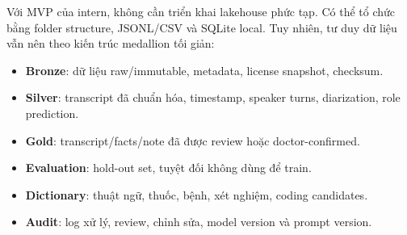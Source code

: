 \documentclass[12pt,a4paper]{article}
\begin{document}
Với MVP của intern, không cần triển khai lakehouse phức tạp. Có thể tổ chức bằng folder structure, JSONL/CSV và SQLite local. Tuy nhiên, tư duy dữ liệu vẫn nên theo kiến trúc medallion tối giản:

\begin{itemize}
    \item \textbf{Bronze}: dữ liệu raw/immutable, metadata, license snapshot, checksum.
    \item \textbf{Silver}: transcript đã chuẩn hóa, timestamp, speaker turns, diarization, role prediction.
    \item \textbf{Gold}: transcript/facts/note đã được review hoặc doctor-confirmed.
    \item \textbf{Evaluation}: hold-out set, tuyệt đối không dùng để train.
    \item \textbf{Dictionary}: thuật ngữ, thuốc, bệnh, xét nghiệm, coding candidates.
    \item \textbf{Audit}: log xử lý, review, chỉnh sửa, model version và prompt version.
\end{itemize}
\end{document}
